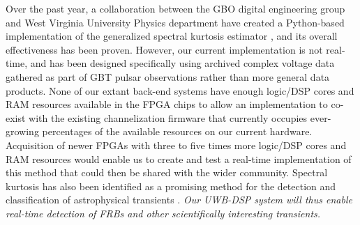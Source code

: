 \documentclass[10pt]{myNSF}
\begin{document}
Over the past year, a collaboration between the GBO digital
engineering group and West Virginia University Physics department have
created a Python-based implementation of the generalized spectral
kurtosis estimator \citep{ng10}, and its overall effectiveness has
been proven. However, our current implementation is not real-time, and
has been designed specifically using archived complex voltage data
gathered as part of GBT pulsar observations rather than more general
data products.  None of our extant back-end systems have enough
logic/DSP cores and RAM resources available in the FPGA chips to allow
an implementation to co-exist with the existing channelization
firmware that currently occupies ever-growing percentages of the
available resources on our current hardware. Acquisition of newer
FPGAs with three to five times more logic/DSP cores and RAM resources
would enable us to create and test a real-time implementation of this
method that could then be shared with the wider community.
Spectral kurtosis has also been identified as a promising method for
the detection and classification of astrophysical transients
\cite{nhmg16}.  \emph{Our UWB-DSP system will thus enable real-time
  detection of FRBs and other scientifically interesting transients.}
\end{document}
